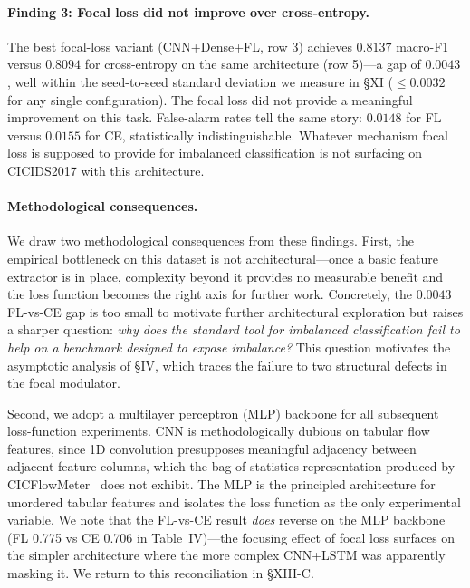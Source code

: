 \documentclass[conference]{IEEEtran}
\theoremstyle{definition}
\begin{document}
\paragraph{Finding 3: Focal loss did not improve over cross-entropy.} The best focal-loss variant (CNN+Dense+FL, row 3) achieves $0.8137$ macro-F1 versus $0.8094$ for cross-entropy on the same architecture (row 5)---a gap of $0.0043$, well within the seed-to-seed standard deviation we measure in §XI ($\le 0.0032$ for any single configuration). The focal loss did not provide a meaningful improvement on this task. False-alarm rates tell the same story: $0.0148$ for FL versus $0.0155$ for CE, statistically indistinguishable. Whatever mechanism focal loss is supposed to provide for imbalanced classification is not surfacing on CICIDS2017 with this architecture.

\paragraph{Methodological consequences.} We draw two methodological consequences from these findings. First, the empirical bottleneck on this dataset is not architectural---once a basic feature extractor is in place, complexity beyond it provides no measurable benefit and the loss function becomes the right axis for further work. Concretely, the $0.0043$ FL-vs-CE gap is too small to motivate further architectural exploration but raises a sharper question: \emph{why does the standard tool for imbalanced classification fail to help on a benchmark designed to expose imbalance?} This question motivates the asymptotic analysis of §IV, which traces the failure to two structural defects in the focal modulator.

Second, we adopt a multilayer perceptron (MLP) backbone for all subsequent loss-function experiments. CNN is methodologically dubious on tabular flow features, since 1D convolution presupposes meaningful adjacency between adjacent feature columns, which the bag-of-statistics representation produced by CICFlowMeter~\cite{lashkari2017cicflowmeter} does not exhibit. The MLP is the principled architecture for unordered tabular features and isolates the loss function as the only experimental variable. We note that the FL-vs-CE result \emph{does} reverse on the MLP backbone (FL 0.775 vs CE 0.706 in Table~IV)---the focusing effect of focal loss surfaces on the simpler architecture where the more complex CNN+LSTM was apparently masking it. We return to this reconciliation in §XIII-C.
\end{document}
